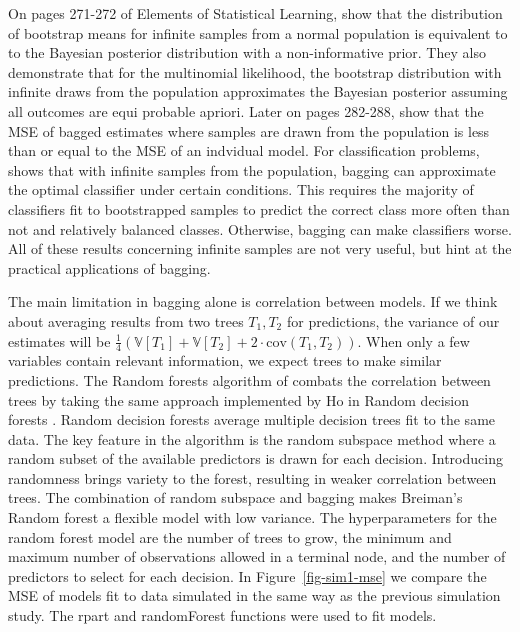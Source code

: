 \documentclass[
  12pt,
  letterpaper,
  DIV=11,
  numbers=noendperiod]{scrartcl}
\begin{document}
On pages 271-272 of Elements of Statistical Learning, \citep{esl} show
that the distribution of bootstrap means for infinite samples from a
normal population is equivalent to to the Bayesian posterior
distribution with a non-informative prior. They also demonstrate that
for the multinomial likelihood, the bootstrap distribution with infinite
draws from the population approximates the Bayesian posterior assuming
all outcomes are equi probable apriori. Later on pages 282-288,
\citep{esl} show that the MSE of bagged estimates where samples are
drawn from the population is less than or equal to the MSE of an
indvidual model. For classification problems, \citep{bagging} shows that
with infinite samples from the population, bagging can approximate the
optimal classifier under certain conditions. This requires the majority
of classifiers fit to bootstrapped samples to predict the correct class
more often than not and relatively balanced classes. Otherwise, bagging
can make classifiers worse. All of these results concerning infinite
samples are not very useful, but hint at the practical applications of
bagging.

The main limitation in bagging alone is correlation between models. If
we think about averaging results from two trees \(T_1,T_2\) for
predictions, the variance of our estimates will be
\(\frac{1}{4}(\mathbb{V}[T_1]+\mathbb{V}[T_2]+2\cdot\text{cov}(T_1, T_2))\).
When only a few variables contain relevant information, we expect trees
to make similar predictions. The Random forests algorithm of
\citep{random_forest} combats the correlation between trees by taking
the same approach implemented by Ho in Random decision forests
\citep{Ho}. Random decision forests average multiple decision trees fit
to the same data. The key feature in the algorithm is the random
subspace method where a random subset of the available predictors is
drawn for each decision. Introducing randomness brings variety to the
forest, resulting in weaker correlation between trees. The combination
of random subspace and bagging makes Breiman's Random forest
\citep{random_forest} a flexible model with low variance. The
hyperparameters for the random forest model are the number of trees to
grow, the minimum and maximum number of observations allowed in a
terminal node, and the number of predictors to select for each decision.
In Figure~\ref{fig-sim1-mse} we compare the MSE of models fit to data
simulated in the same way as the previous simulation study. The rpart
\citep{rpart} and randomForest \citep{rf_r} functions were used to fit
models.
\end{document}
